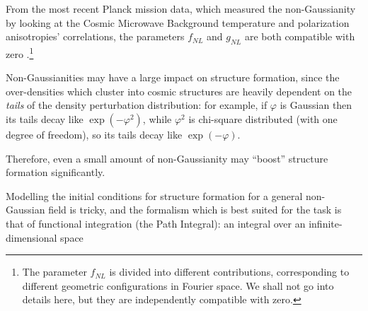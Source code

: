 \documentclass[main.tex]{subfiles}
\begin{document}
From the most recent Planck mission data, which measured the non-Gaussianity by looking at the Cosmic Microwave Background temperature and polarization anisotropies' correlations, the parameters \(f_{NL}\) and \(g_{NL}\) are both compatible with zero \cite[]{planckcollaborationPlanck2018Results2019}.\footnote{The parameter \(f_{{NL}}\) is divided into different contributions, corresponding to different geometric configurations in Fourier space. We shall not go into details here, but they are independently compatible with zero.}

Non-Gaussianities may have a large impact on structure formation, since the over-densities which cluster into cosmic structures are heavily dependent on the \emph{tails} of the density perturbation distribution: for example, if \(\varphi \) is Gaussian then its tails decay like \(\exp(- \varphi^2)\), while \(\varphi^2\) is chi-square distributed (with one degree of freedom), so its tails decay like \(\exp(- \varphi )\).

Therefore, even a small amount of non-Gaussianity may ``boost'' structure formation significantly.


Modelling the initial conditions for structure formation for a general non-Gaussian field is tricky, and the formalism which is best suited for the task is that of functional integration (the Path Integral): an integral over an infinite-dimensional space






\end{document}
